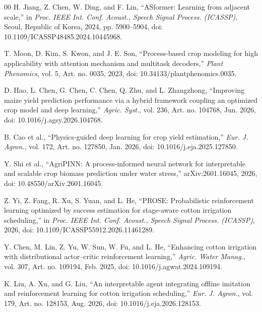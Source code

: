 \documentclass{article}
\begin{document}
\begin{thebibliography}{00}
H. Jiang, Z. Chen, W. Ding, and F. Lin, ``ASformer: Learning from adjacent scale,'' in \emph{Proc. IEEE Int. Conf. Acoust., Speech Signal Process. (ICASSP)}, Seoul, Republic of Korea, 2024, pp. 5900--5904, doi: 10.1109/ICASSP48485.2024.10445968.

T. Moon, D. Kim, S. Kwon, and J. E. Son, ``Process-based crop modeling for high applicability with attention mechanism and multitask decoders,'' \emph{Plant Phenomics}, vol. 5, Art. no. 0035, 2023, doi: 10.34133/plantphenomics.0035.

D. Hao, L. Chen, G. Chen, C. Chen, Q. Zhu, and L. Zhangzhong, ``Improving maize yield prediction performance via a hybrid framework coupling an optimized crop model and deep learning,'' \emph{Agric. Syst.}, vol. 236, Art. no. 104768, Jun. 2026, doi: 10.1016/j.agsy.2026.104768.

B. Cao et al., ``Physics-guided deep learning for crop yield estimation,'' \emph{Eur. J. Agron.}, vol. 172, Art. no. 127850, Jan. 2026, doi: 10.1016/j.eja.2025.127850.

Y. Shi et al., ``AgriPINN: A process-informed neural network for interpretable and scalable crop biomass prediction under water stress,'' arXiv:2601.16045, 2026, doi: 10.48550/arXiv.2601.16045.

Z. Yi, Z. Fang, R. Xu, S. Yuan, and L. He, ``PROSE: Probabilistic reinforcement learning optimized by success estimation for stage-aware cotton irrigation scheduling,'' in \emph{Proc. IEEE Int. Conf. Acoust., Speech Signal Process. (ICASSP)}, 2026, doi: 10.1109/ICASSP55912.2026.11461289.

Y. Chen, M. Lin, Z. Yu, W. Sun, W. Fu, and L. He, ``Enhancing cotton irrigation with distributional actor--critic reinforcement learning,'' \emph{Agric. Water Manag.}, vol. 307, Art. no. 109194, Feb. 2025, doi: 10.1016/j.agwat.2024.109194.

K. Liu, A. Xu, and G. Liu, ``An interpretable agent integrating offline imitation and reinforcement learning for cotton irrigation scheduling,'' \emph{Eur. J. Agron.}, vol. 179, Art. no. 128153, Aug. 2026, doi: 10.1016/j.eja.2026.128153.

\end{thebibliography}
\end{document}
